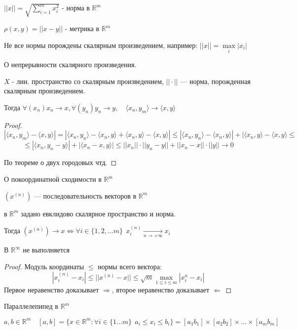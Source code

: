 $||x|| = \sqrt{\sum\limits_{i=1}^m x_i^2}$ - норма в $\mathbb{R}^m$

$\rho(x,y)=||x-y||$ - метрика в $\mathbb{R}^m$

Не все нормы порождены скалярным произведением, например: $||x||=\max\limits_i |x_i|$

\begin{lemma}
    О непрерывности скалярного произведения.

    $X$ - лин. пространство со скалярным произведением, $||\cdot||$ --- норма, порожденная скалярным произведением.

    Тогда $\forall (x_n) x_n\to x, \forall (y_n) y_n\to y, \quad \langle x_n,y_m\rangle\to\langle x,y\rangle$
\end{lemma}

\begin{proof}
    $$|\langle x_n,y_m\rangle - \langle x,y\rangle|=|\langle x_n,y_n\rangle - \langle x_n,y\rangle + \langle x_n,y\rangle - \langle x,y\rangle|\leq|\langle x_n,y_n\rangle-\langle x_n,y\rangle| + |\langle x_n,y\rangle-\langle x,y\rangle\leq$$
    $$\leq |\langle x_n,y_n-y\rangle| + |\langle x_n-x,y\rangle|\leq ||x_n||\cdot||y_n-y||+||x_n-x||\cdot||y|| \to 0$$

    По теореме о двух городовых чтд.
\end{proof}

\begin{lemma}
    О покоординатной сходимости в $\mathbb{R}^m$

    $(x^{(n)})$ --- последовательность векторов в $\mathbb{R}^m$
    
    в $\mathbb{R}^m$ задано евклидово скалярное пространство и норма.

    Тогда $(x^{(n)})\to x \Leftrightarrow \forall i\in\{1,2,\ldots m\} \ \ x_i^{(n)}\underset{n\to+\infty}\to x_i$
\end{lemma}

\begin{remark}
    В $\mathbb{R}^{\infty}$ не выполняется
\end{remark}

\begin{proof}
    Модуль координаты $\leq$ нормы всего вектора:
    $$|x_i^{(n)}-x_i|\leq ||x^{(n)}-x||\leq \sqrt{m}\max\limits_{1\leq i\leq m} |x_i^{n}-x_i|$$
    Первое неравенство доказывает $\Rightarrow$, второе неравенство доказывает $\Leftarrow$
\end{proof}

\begin{definition}
    Параллелепипед в $\mathbb{R}^m$

    $a,b\in\mathbb{R}^m \quad [a,b]=\{x \in\mathbb{R}^m : \forall i\in\{1\ldots m\} \ \ a_i\leq x_i\leq b_i \} = [a_1b_1]\times[a_2b_2]\times\ldots\times[a_mb_m]$
\end{definition}

